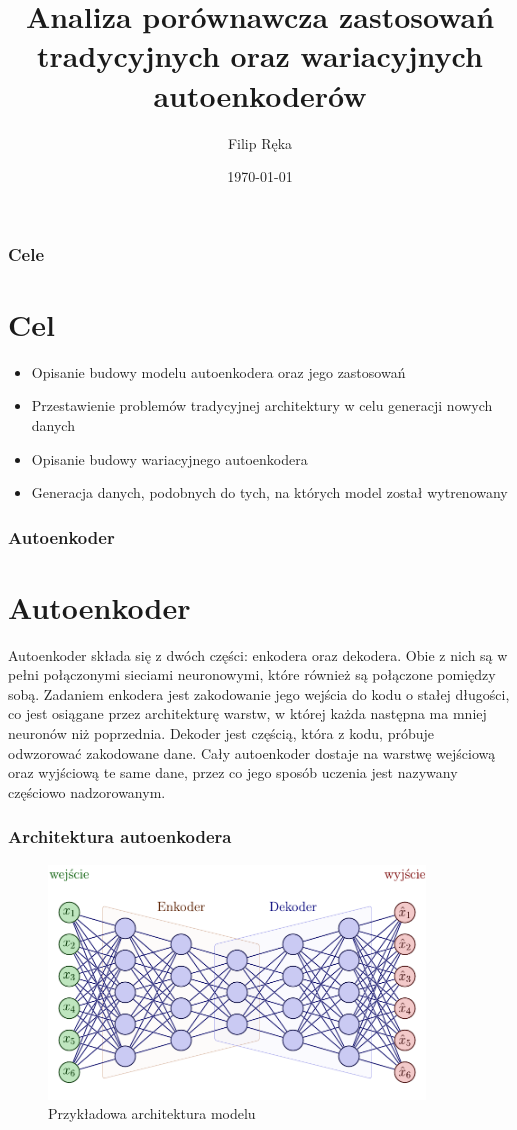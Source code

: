 \documentclass{beamer}
\title[]{Analiza porównawcza zastosowań tradycyjnych oraz wariacyjnych autoenkoderów}
\institute[UMCS]
{
	Uniwersytet Marii Curie Skłodowskiej
	\medskip
}
\author{Filip Ręka}
\date{\today}
\begin{document}
	\begin{frame}
		\titlepage
	\end{frame}

	\begin{frame}
		\tableofcontents
	\end{frame}
	\begin{frame}
		\frametitle{Cele}
		\section{Cel}
		\begin{itemize}
			\item Opisanie budowy modelu autoenkodera oraz jego zastosowań
			\item Przestawienie problemów tradycyjnej architektury w celu generacji nowych danych
			\item Opisanie budowy wariacyjnego autoenkodera
			\item Generacja danych, podobnych do tych, na których model został wytrenowany
		\end{itemize}
	\end{frame}
	\begin{frame}
		\frametitle{Autoenkoder}
		\section{Autoenkoder}
		Autoenkoder składa się z dwóch części: enkodera oraz dekodera. Obie z nich są w pełni połączonymi sieciami neuronowymi, które również są połączone pomiędzy sobą. Zadaniem enkodera jest zakodowanie jego wejścia do kodu o stałej długości, co jest osiągane przez architekturę warstw, w której każda następna ma mniej neuronów niż poprzednia. Dekoder jest częścią, która z kodu, próbuje odwzorować zakodowane dane. Cały autoenkoder dostaje na warstwę wejściową oraz wyjściową te same dane, przez co jego sposób uczenia jest nazywany częściowo nadzorowanym. 
	\end{frame}

	\begin{frame}
		\frametitle{Architektura autoenkodera}
		\begin{figure}
			\centering\includegraphics[width=10cm]{tikzae.pdf}
			\caption{Przykładowa architektura modelu}
		\end{figure}
	\end{frame}
\end{document}

